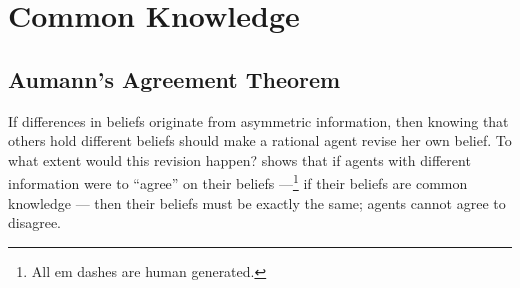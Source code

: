 \chapter{Common Knowledge}

\section{Aumann's Agreement Theorem}
%
%


If differences in beliefs originate from asymmetric information, then knowing that others hold different beliefs should make a rational agent revise her own belief.
To what extent would this revision happen?
\Textcite{aumann1976AgreeingDisagree} shows that if agents with different information were to ``agree'' on their beliefs ---\footnote{All em dashes are human generated.} if their beliefs are common knowledge --- then their beliefs must be exactly the same; agents cannot agree to disagree.

